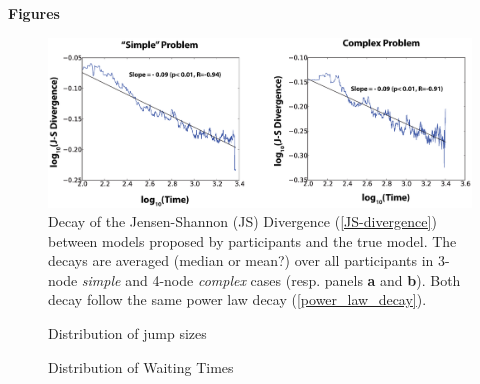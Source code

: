 \begin{center}
{\Large {\bf Figures}}
\vspace{3cm}
\end{center}


\begin{figure}[h!]
\begin{center}
\includegraphics[width=15cm]{figures/ConvergenceMeans.eps}
\caption{Decay of the Jensen-Shannon (JS) Divergence (\ref{JS-divergence}) between models proposed by participants and the true model. The decays are averaged (median or mean?) over all participants in 3-node {\it simple} and 4-node {\it complex} cases (resp. panels {\bf a} and {\bf b}). Both decay follow the same power law decay (\ref{power_law_decay}).}
\label{fig:decay}
\end{center}
\end{figure}

\begin{figure}[h!]
\begin{center}
\caption{Distribution of jump sizes}
\label{fig:jump_sizes}
\end{center}
\end{figure}

\begin{figure}[h!]
\begin{center}
\caption{Distribution of Waiting Times}
\label{fig:waiting_times}
\end{center}
\end{figure}


